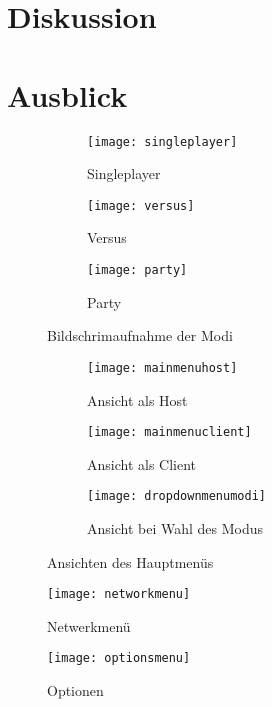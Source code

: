 \chapter{Diskussion}
\chapter{Ausblick}

\begin{figure}[b]
	\centering	
	\begin{subfigure}[a]{0.3\linewidth}
		\texttt{[image: singleplayer]}
		\caption{Singleplayer}
		\label{fig:singleplayer}
	\end{subfigure}	
	\begin{subfigure}[a]{0.3\linewidth}
		\texttt{[image: versus]}
		\caption{Versus}
		\label{fig:versus}
	\end{subfigure}
	\begin{subfigure}[a]{0.3\linewidth}
		\texttt{[image: party]}
		\caption{Party}
		\label{fig:party}
	\end{subfigure}	
	\caption{Bildschrimaufnahme der Modi}
    \label{fig:modi}
\end{figure}

\begin{figure}[b]
	\centering
    \begin{subfigure}[a]{0.3\linewidth}
    	\texttt{[image: mainmenuhost]}
    	\caption{Ansicht als Host}
        \label{fig:menuhost}
    \end{subfigure}
    \begin{subfigure}[a]{0.3\linewidth}
    	\texttt{[image: mainmenuclient]}
    	\caption{Ansicht als Client}
        \label{fig:menuclient}
    \end{subfigure}
    \begin{subfigure}[a]{0.3\linewidth}
    	\texttt{[image: dropdownmenumodi]}
    	\caption{Ansicht bei Wahl des Modus}
        \label{fig:menumodi}
    \end{subfigure}
    \caption{Ansichten des Hauptmenüs}
    \label{menu}
\end{figure}

\begin{wrapfigure}{r}{0.3\textwidth}
	\centering
	\texttt{[image: networkmenu]}
    \caption{Netwerkmenü}
   \label{network}
\end{wrapfigure}

\begin{wrapfigure}{r}{0.3\textwidth}
	\centering
    \texttt{[image: optionsmenu]}
    \caption{Optionen}
    \label{option}
\end{wrapfigure}
%


\listoffigures
%


